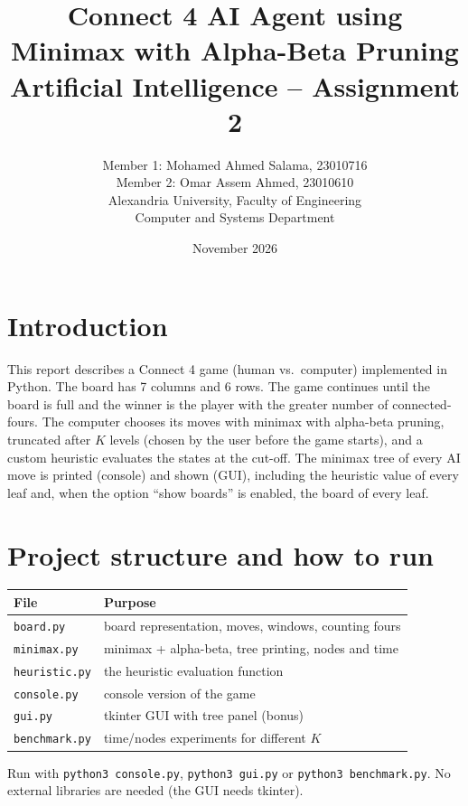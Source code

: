 \documentclass[11pt,a4paper]{article}
\title{Connect 4 AI Agent using Minimax with Alpha-Beta Pruning\\[6pt]
\large Artificial Intelligence -- Assignment 2}
\author{Member 1: Mohamed Ahmed Salama, 23010716\\
Member 2: Omar Assem Ahmed, 23010610\\[8pt]
Alexandria University, Faculty of Engineering\\
Computer and Systems Department}
\date{November 2026}
\begin{document}
\maketitle
\tableofcontents
\newpage

\section{Introduction}
This report describes a Connect 4 game (human vs.\ computer) implemented in Python.
The board has 7 columns and 6 rows. The game continues until the board is full and the
winner is the player with the greater number of connected-fours. The computer chooses
its moves with minimax with alpha-beta pruning, truncated after $K$ levels (chosen by
the user before the game starts), and a custom heuristic evaluates the states at the
cut-off. The minimax tree of every AI move is printed (console) and shown (GUI),
including the heuristic value of every leaf and, when the option ``show boards'' is
enabled, the board of every leaf.

\section{Project structure and how to run}
\begin{center}
\begin{tabular}{@{}ll@{}}
\toprule
File & Purpose\\
\midrule
\texttt{board.py} & board representation, moves, windows, counting fours\\
\texttt{minimax.py} & minimax + alpha-beta, tree printing, nodes and time\\
\texttt{heuristic.py} & the heuristic evaluation function\\
\texttt{console.py} & console version of the game\\
\texttt{gui.py} & tkinter GUI with tree panel (bonus)\\
\texttt{benchmark.py} & time/nodes experiments for different $K$\\
\bottomrule
\end{tabular}
\end{center}
Run with \texttt{python3 console.py}, \texttt{python3 gui.py} or \texttt{python3 benchmark.py}.
No external libraries are needed (the GUI needs tkinter).

\end{document}
